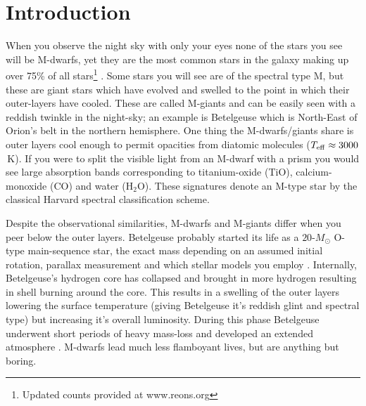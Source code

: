 

\chapter{Introduction}\label{chapter:introduction}

When you observe the night sky with only your eyes none of the stars you see will be M-dwarfs, yet they are the most common stars in the galaxy making up over 75\% of all stars\footnote{Updated counts provided at www.reons.org} \cite{2006AJ....132.2360H}. Some stars you will see are of the spectral type M, but these are giant stars which have evolved and swelled to the point in which their outer-layers have cooled. These are called M-giants and can be easily seen with a reddish twinkle in the night-sky; an example is Betelgeuse which is North-East of Orion's belt in the northern hemisphere. One thing the M-dwarfs/giants share is outer layers cool enough to permit opacities from diatomic molecules ($T_{\rm eff} \approx 3000$\,K). If you were to split the visible light from an M-dwarf with a prism you would see large absorption bands corresponding to titanium-oxide (TiO), calcium-monoxide (CO) and water (H$_2$O). These signatures denote an M-type star by the classical Harvard spectral classification scheme. 

Despite the observational similarities, M-dwarfs and M-giants differ when you peer below the outer layers. Betelgeuse probably started its life as a $20$-$M_{\odot}$ O-type main-sequence star, the exact mass depending on an assumed initial rotation, parallax measurement and which stellar models you employ \cite{2013EAS....60..307V}. Internally, Betelgeuse's hydrogen core has collapsed and brought in more hydrogen resulting in shell burning around the core. This results in a swelling of the outer layers lowering the surface temperature (giving Betelgeuse it's reddish glint and spectral type) but increasing it's overall luminosity. During this phase Betelgeuse underwent short periods of heavy mass-loss and developed an extended atmosphere \cite{2014Natur.512..282M}. M-dwarfs lead much less flamboyant lives, but are anything but boring.




